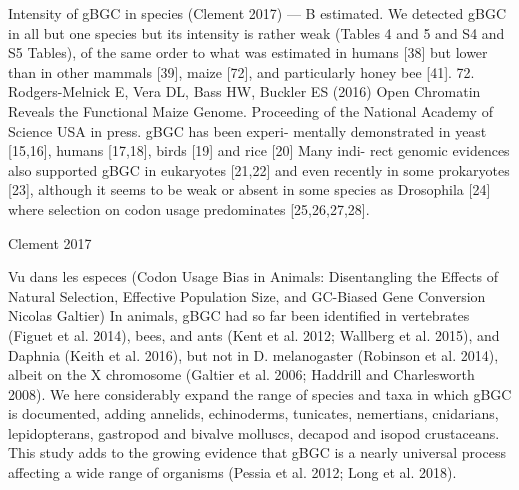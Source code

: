 Intensity of gBGC in species (Clement 2017) — B estimated.
We detected gBGC in all but one species but its intensity is rather weak (Tables 4 and 5 and S4 and S5 Tables), of the same order to what was estimated in humans [38] but lower than in other mammals [39], maize [72], and particularly honey bee [41].
72. Rodgers-Melnick E, Vera DL, Bass HW, Buckler ES (2016) Open Chromatin Reveals the Functional Maize Genome. Proceeding of the National Academy of Science USA in press.
%
gBGC has been experi- mentally demonstrated in yeast [15,16], humans [17,18], birds [19] and rice [20]
 Many indi- rect genomic evidences also supported gBGC in eukaryotes [21,22] and even recently in some prokaryotes [23], although it seems to be weak or absent in some species as Drosophila [24] where selection on codon usage predominates [25,26,27,28].


Clement 2017


Vu dans les especes (Codon Usage Bias in Animals: Disentangling the Effects of Natural Selection, Effective Population Size, and GC-Biased Gene Conversion  Nicolas Galtier)
In animals, gBGC had so far been identified in vertebrates (Figuet et al. 2014), bees, and ants (Kent et al. 2012; Wallberg et al. 2015), and Daphnia (Keith et al. 2016), but not in D. melanogaster (Robinson et al. 2014), albeit on the X chromosome (Galtier et al. 2006; Haddrill and Charlesworth 2008).
We here considerably expand the range of species and taxa in which gBGC is documented, adding annelids, echinoderms, tunicates, nemertians, cnidarians, lepidopterans, gastropod and bivalve molluscs, decapod and isopod crustaceans. 
This study adds to the growing evidence that gBGC is a nearly universal process affecting a wide range of organisms (Pessia et al. 2012; Long et al. 2018).


